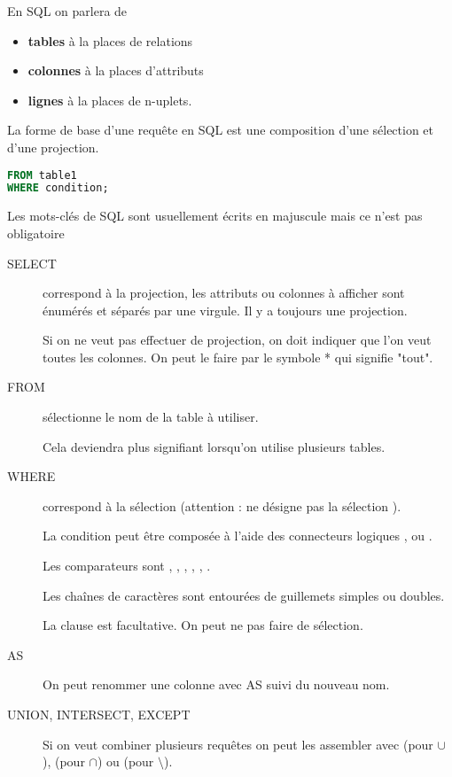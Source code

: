 En SQL on parlera de 
\begin{itemize}
\item {\bf tables} à la places de relations
\item {\bf colonnes} à la places d'attributs
\item {\bf lignes} à la places de n-uplets.
\end{itemize}
La forme de base d'une requête en SQL est une composition d'une sélection et d'une projection.
\begin{lstlisting}[language=SQL]
FROM table1
WHERE condition;
\end{lstlisting}
Les mots-clés de SQL sont usuellement écrits en majuscule mais ce n'est pas obligatoire
\begin{description}
\item[SELECT] correspond à la projection, les attributs ou colonnes à afficher sont énumérés et séparés par une virgule. Il y a toujours une projection.

Si on ne veut pas effectuer de projection, on doit indiquer que l'on veut toutes les colonnes. On peut le faire par le symbole * qui signifie "tout".
\item[FROM] sélectionne le nom de la table à utiliser. 

Cela deviendra plus signifiant lorsqu'on utilise plusieurs tables.
\item[WHERE] correspond à la sélection (attention :  ne désigne pas la sélection ). 

La condition peut être composée à l'aide des connecteurs logiques ,  ou . 

Les comparateurs sont \type{=}, \type{>}, \type{<}, \type{>=}, \type{<=}, \type{!=}. 

Les chaînes de caractères sont entourées de guillemets simples ou doubles.

La clause  est facultative. On peut ne pas faire de sélection.
\item[AS] On peut renommer une colonne avec {AS} suivi du nouveau nom.
\item[UNION, INTERSECT, EXCEPT] Si on veut combiner plusieurs requêtes on peut les assembler avec  (pour $\cup$),  (pour $\cap$) ou  (pour $\setminus$).
\end{description}

